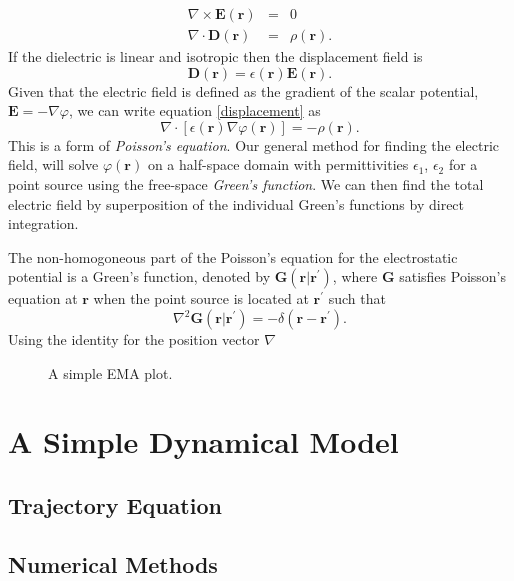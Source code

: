 \documentclass[a4paper, 12pt]{article}
\begin{document}
\begin{eqnarray}
\nabla \times \mathbf{E(r)}&=&0 \\
\nabla \cdot \mathbf{D(r)}&=&\rho(\mathbf{r}).
\end{eqnarray}
If the dielectric is linear and isotropic then the displacement field is 
\begin{equation}\label{displacement}
\mathbf{D(r)} = \epsilon(\mathbf{r})\mathbf{E}(\mathbf{r}).
\end{equation}
Given that the electric field is defined as the gradient of the scalar potential, $\mathbf{E}=-\nabla \varphi $, we can write equation \ref{displacement} as 
\begin{equation}
\nabla \cdot \left[\epsilon(\mathbf{r})\nabla \varphi (\mathbf{r}) \right] = -\rho (\mathbf{r}).
\end{equation}
This is a form of \emph{Poisson's equation}. Our general method for finding the electric field, will solve $\varphi (\mathbf{r})$ on a half-space domain with permittivities $\epsilon_1$, $\epsilon_2$ for a point source using the free-space \emph{Green's function}. We can then find the total electric field by superposition of the individual Green's functions by direct integration.

The non-homogoneous part of the Poisson's equation for the electrostatic potential is a Green's function, denoted by $\mathbf{G}(\mathbf{r} | \mathbf{r^\prime})$, where $\mathbf{G}$ satisfies Poisson's equation at $\mathbf{r}$ when the point source is located at $\mathbf{r^\prime}$ such that
\begin{equation}
\nabla^2 \mathbf{G}(\mathbf{r} | \mathbf{r^\prime}) = -\delta( \mathbf{r} - \mathbf{r^\prime}).
\end{equation}
Using the identity for the position vector $\nabla$

\begin{figure}[htb]
    \centering
    
    \caption{A simple EMA plot.\label{fig:E0}}
\end{figure}

\section{A Simple Dynamical Model}
\subsection{Trajectory Equation}
\subsection{Numerical Methods}
\end{document}
